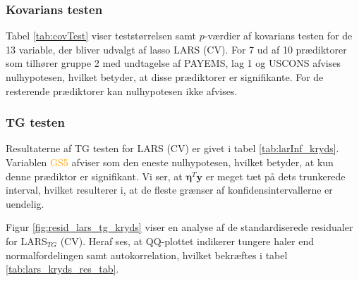 \subsubsection{Kovarians testen}
Tabel \ref{tab:covTest} viser teststørrelsen samt $p$-værdier af kovarians testen for de 13 variable, der bliver udvalgt af lasso LARS (CV). 
For 7 ud af 10 prædiktorer som tilhører gruppe 2 med undtagelse af \textcolor{blue3}{PAYEMS}, \textcolor{blue3}{lag 1} og \textcolor{blue3}{USCONS} afvises nulhypotesen, hvilket betyder, at disse prædiktorer er signifikante.
For de resterende prædiktorer kan nulhypotesen ikke afvises.



\subsubsection{TG testen}
Resultaterne af TG testen for LARS (CV) er givet i tabel \ref{tab:larInf_kryds}.
Variablen  \textcolor{orange}{GS5} afviser som den eneste nulhypotesen, hvilket betyder, at kun denne prædiktor er signifikant.
Vi ser, at $\boldsymbol{\eta}^T \textbf{y}$ er meget tæt på dets trunkerede interval, hvilket resulterer i, at de fleste grænser af konfidensintervallerne er uendelig. 



Figur \ref{fig:resid_lars_tg_kryds} viser en analyse af de standardiserede residualer for LARS$_{TG}$ (CV). 
Heraf ses, at QQ-plottet indikerer tungere haler end normalfordelingen samt autokorrelation, hvilket bekræftes i tabel \ref{tab:lars_kryds_res_tab}. 





